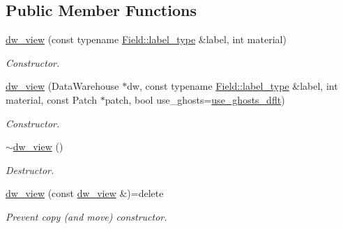 \subsection*{Public Member Functions}
\begin{DoxyCompactItemize}
\item 
\hyperlink{classUintah_1_1PhaseField_1_1detail_1_1dw__view_3_01ScalarField_3_01T_01_4_00_01VAR_00_01DIM_00_01GN_01_4_aa305d01f0cabaad24c3114531b5b93a9}{dw\+\_\+view} (const typename \hyperlink{structUintah_1_1PhaseField_1_1ScalarField_a7a77875e030da64c47ce9f6c22a06959}{Field\+::label\+\_\+type} \&label, int material)
\begin{DoxyCompactList}\small\item\em Constructor. \end{DoxyCompactList}\item 
\hyperlink{classUintah_1_1PhaseField_1_1detail_1_1dw__view_3_01ScalarField_3_01T_01_4_00_01VAR_00_01DIM_00_01GN_01_4_ad680d20420eb348dd7084950fd3f52a5}{dw\+\_\+view} (Data\+Warehouse $\ast$dw, const typename \hyperlink{structUintah_1_1PhaseField_1_1ScalarField_a7a77875e030da64c47ce9f6c22a06959}{Field\+::label\+\_\+type} \&label, int material, const Patch $\ast$patch, bool use\+\_\+ghosts=\hyperlink{classUintah_1_1PhaseField_1_1detail_1_1dw__view_3_01ScalarField_3_01T_01_4_00_01VAR_00_01DIM_00_01GN_01_4_a6d76ec22f8cb6a0aff18f14f846950b0}{use\+\_\+ghosts\+\_\+dflt})
\begin{DoxyCompactList}\small\item\em Constructor. \end{DoxyCompactList}\item 
\hyperlink{classUintah_1_1PhaseField_1_1detail_1_1dw__view_3_01ScalarField_3_01T_01_4_00_01VAR_00_01DIM_00_01GN_01_4_a921ce3dea17d712cc07e590117e3c5b3}{$\sim$dw\+\_\+view} ()
\begin{DoxyCompactList}\small\item\em Destructor. \end{DoxyCompactList}\item 
\hyperlink{classUintah_1_1PhaseField_1_1detail_1_1dw__view_3_01ScalarField_3_01T_01_4_00_01VAR_00_01DIM_00_01GN_01_4_a5f179cba166e0f680869c355669f87a9}{dw\+\_\+view} (const \hyperlink{classUintah_1_1PhaseField_1_1detail_1_1dw__view}{dw\+\_\+view} \&)=delete
\begin{DoxyCompactList}\small\item\em Prevent copy (and move) constructor. \end{DoxyCompactList}\item 

\end{DoxyCompactItemize}
